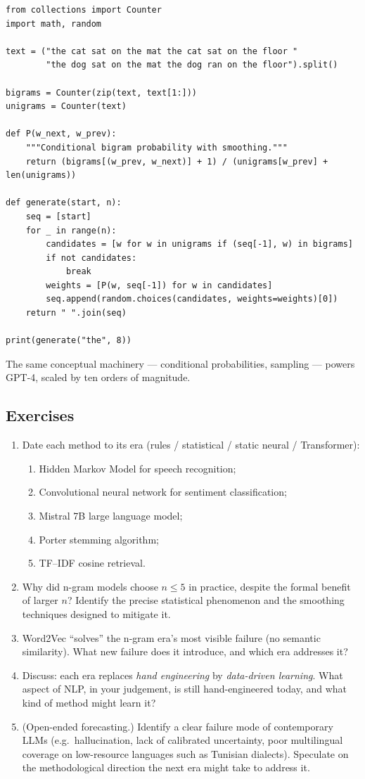 \begin{lstlisting}
from collections import Counter
import math, random

text = ("the cat sat on the mat the cat sat on the floor "
        "the dog sat on the mat the dog ran on the floor").split()

bigrams = Counter(zip(text, text[1:]))
unigrams = Counter(text)

def P(w_next, w_prev):
    """Conditional bigram probability with smoothing."""
    return (bigrams[(w_prev, w_next)] + 1) / (unigrams[w_prev] + len(unigrams))

def generate(start, n):
    seq = [start]
    for _ in range(n):
        candidates = [w for w in unigrams if (seq[-1], w) in bigrams]
        if not candidates:
            break
        weights = [P(w, seq[-1]) for w in candidates]
        seq.append(random.choices(candidates, weights=weights)[0])
    return " ".join(seq)

print(generate("the", 8))
\end{lstlisting}

The same conceptual machinery --- conditional probabilities, sampling --- powers GPT-4, scaled by ten orders of magnitude.

\subsection{Exercises}
\begin{enumerate}
    \item Date each method to its era (rules / statistical / static neural / Transformer):
    \begin{enumerate}
        \item Hidden Markov Model for speech recognition;
        \item Convolutional neural network for sentiment classification;
        \item Mistral 7B large language model;
        \item Porter stemming algorithm;
        \item TF--IDF cosine retrieval.
    \end{enumerate}
    \item Why did n-gram models choose $n \le 5$ in practice, despite the formal benefit of larger $n$? Identify the precise statistical phenomenon and the smoothing techniques designed to mitigate it.
    \item Word2Vec ``solves'' the n-gram era's most visible failure (no semantic similarity). What new failure does it introduce, and which era addresses it?
    \item Discuss: each era replaces \emph{hand engineering} by \emph{data-driven learning}. What aspect of NLP, in your judgement, is still hand-engineered today, and what kind of method might learn it?
    \item (Open-ended forecasting.) Identify a clear failure mode of contemporary LLMs (e.g.\ hallucination, lack of calibrated uncertainty, poor multilingual coverage on low-resource languages such as Tunisian dialects). Speculate on the methodological direction the next era might take to address it.
\end{enumerate}
